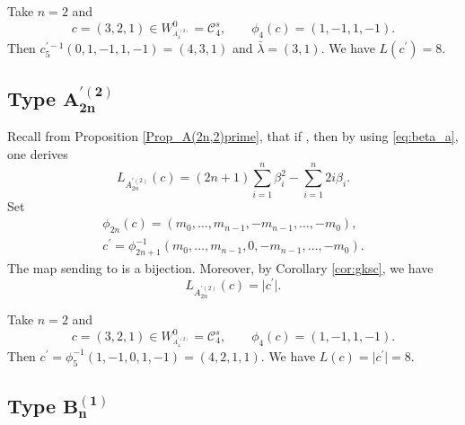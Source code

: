 \documentclass[pdftex]{sigma}
\numberwithin{equation}{section}
\newcommand{\cC}{\mathcal{C}}
\begin{document}
\begin{Example}
	Take $n=2$ and
\[
c=(3,2,1)\in W_{^{A_{4}^{\prime (2)}}}^{0}=\mathcal{C}%
	_{4}^{s},\qquad   \phi_{4}(c)=(1,-1,1,-1).
\] Then $c^{\prime
		-1}_{5}(0,1,-1,1,-1)=(4,3,1)$ and $\bar{\lambda}=(3,1)$. We have $	L(c^{\prime })=8$.
\end{Example}

\subsection[Type A\_\{2n\}\^{}\{'(2)\}]{Type $\boldsymbol{A_{2n}^{\prime (2)}}$}

Recall from Proposition \ref{Prop_A(2n,2)prime}, that if , then by using \eqref{eq:beta_a}, one derives
\begin{equation*}
L_{A_{2n}^{\prime (2)}}(c)=(2n+1)\sum_{i=1}^{n}\beta
_{i}^{2}-\sum_{i=1}^{n}2i\beta _{i}.
\end{equation*}
Set
\begin{gather*}
\phi _{2n}(c)=(m_{0},\dots ,m_{n-1},-m_{n-1},\dots ,-m_{0}),\\   c^{\prime }=\phi _{2n+1}^{-1}(m_{0},\dots ,m_{n-1},0,-m_{n-1},\dots ,-m_{0}).
\end{gather*}
The map sending \smash{$c\in \cC_{n}^{s}$} to \smash{$c^{\prime }\in \cC_{2n+1}^{s}$} is a bijection. Moreover, by Corollary \ref{cor:gksc}, we have
\begin{equation*}
L_{A_{2n}^{\prime (2)}}(c)=\lvert c^{\prime }\rvert.
\end{equation*}

\begin{Example}
	Take $n=2$ and
\[
c=(3,2,1)\in W_{^{A_{4}^{\prime (2)}}}^{0}=\mathcal{C}%
	_{4}^{s}, \qquad  \phi _{4}(c)=(1,-1,1,-1).
\] Then $c^{\prime }=\phi
	_{5}^{-1}(1,-1,0,1,-1)=(4,2,1,1)$. We have $L(c)=\vert c^{\prime
	} \vert =8$.
\end{Example}

%
%

\subsection[Type B\_n\^{}(1)]{Type $\boldsymbol{B_{n}^{(1)}}$}
\end{document}
